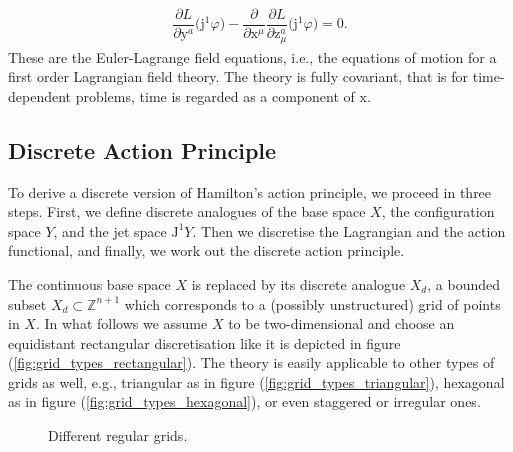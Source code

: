 \documentclass[12pt,a4paper,reqno]{article}
\begin{document}
\begin{align}\label{eq:variational_continuous_euler_lagrange}
\dfrac{\partial L}{\partial {\ensuremath{{\ensuremath{\mathrm{{y}}}}}}^{a}} \big( {\ensuremath{\mathrm{j}}}^{1} {\ensuremath{\varphi}} \big) - \dfrac{\partial}{\partial {\ensuremath{{\ensuremath{\mathrm{{x}}}}}}^{\mu}} \dfrac{\partial L}{\partial {\ensuremath{{\ensuremath{\mathrm{{z}}}}}}^{a}_{\mu}} \big( {\ensuremath{\mathrm{j}}}^{1} {\ensuremath{\varphi}} \big) = 0 .
\end{align}
These are the Euler-Lagrange field equations, i.e., the equations of motion for a first order Lagrangian field theory.
The theory is fully covariant, that is for time-dependent problems, time is regarded as a component of ${\ensuremath{{\ensuremath{\mathrm{{x}}}}}}$.

\subsection{Discrete Action Principle}
\label{sec:vi_discrete_action_principle}

To derive a discrete version of Hamilton's action principle, we proceed in three steps.
First, we define discrete analogues of the base space $X$, the configuration space $Y$, and the jet space ${\ensuremath{\mathrm{J}}}^{1} Y$. Then we discretise the Lagrangian and the action functional, and finally, we work out the discrete action principle.

The continuous base space $X$ is replaced by its discrete analogue $X_{d}$, a bounded subset $X_{d} \subset \mathbb{Z}^{n+1}$ which corresponds to a (possibly unstructured) grid of points in $X$.
In what follows we assume $X$ to be two-dimensional and choose an equidistant rectangular discretisation like it is depicted in figure (\ref{fig:grid_types_rectangular}). The theory is easily applicable to other types of grids as well, e.g., triangular as in figure (\ref{fig:grid_types_triangular}), hexagonal as in figure (\ref{fig:grid_types_hexagonal}), or even staggered or irregular ones.

\begin{figure}[tb]
	\centering
	\caption{Different regular grids.}
	\label{fig:grid_types}
\end{figure}
\end{document}
